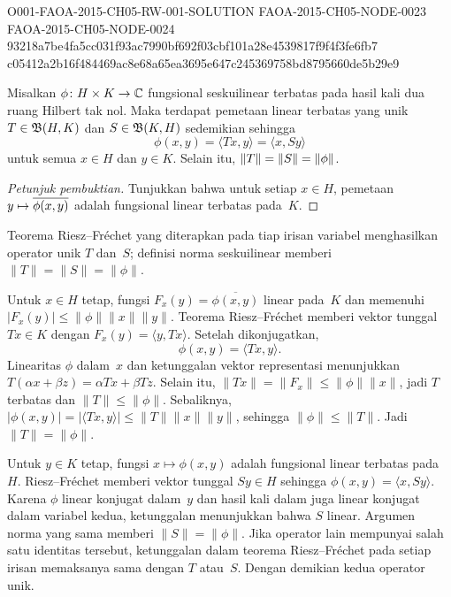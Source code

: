 \begin{o001readerwork}
  {O001-FAOA-2015-CH05-RW-001-SOLUTION}
  {FAOA-2015-CH05-NODE-0023}
  {FAOA-2015-CH05-NODE-0024}
  {93218a7be4fa5cc031f93ac7990bf692f03cbf101a28e4539817f9f4f3fe6fb7}
  {c05412a2b16f484469ac8e68a65ea3695e647c245369758bd8795660de5b29e9}
\begin{o001result}
\begin{prop} Misalkan $\phi \colon H \times K \rightarrow \mathbb{C}$ fungsional seskuilinear terbatas pada
hasil kali dua ruang Hilbert tak nol. Maka terdapat pemetaan linear terbatas yang unik $T \in \mathfrak{B}(H,K)$ dan
$S \in \mathfrak{B}(K,H)$ sedemikian sehingga
    \[ \phi(x,y) = \langle Tx,y \rangle = \langle x,Sy \rangle \]
untuk semua $x \in H$ dan $y \in K$. Selain itu, $\lVert T\rVert = \lVert S\rVert = \lVert\phi\rVert$.
\end{prop}
\end{o001result}
\begin{o001sourcehint}
\begin{proof}[\emph{Petunjuk pembuktian}] Tunjukkan bahwa untuk setiap $x \in H$, pemetaan
$y \mapsto \overline{\phi(x,y)}$ adalah fungsional linear terbatas pada~$K$. \ns
\end{proof}
\end{o001sourcehint}
\begin{o001answer}
Teorema Riesz--Fréchet yang diterapkan pada tiap irisan variabel menghasilkan
operator unik $T$ dan~$S$; definisi norma seskuilinear memberi
$\|T\|=\|S\|=\|\phi\|$.
\end{o001answer}
\begin{o001proof}
Untuk $x\in H$ tetap, fungsi
$F_x(y)=\overline{\phi(x,y)}$ linear pada~$K$ dan memenuhi
$|F_x(y)|\leq\|\phi\|\|x\|\|y\|$. Teorema Riesz--Fréchet memberi vektor
tunggal $Tx\in K$ dengan $F_x(y)=\langle y,Tx\rangle$. Setelah dikonjugatkan,
\[
 \phi(x,y)=\langle Tx,y\rangle.
\]
Linearitas $\phi$ dalam~$x$ dan ketunggalan vektor representasi menunjukkan
$T(\alpha x+\beta z)=\alpha Tx+\beta Tz$. Selain itu,
$\|Tx\|=\|F_x\|\leq\|\phi\|\|x\|$, jadi $T$ terbatas dan
$\|T\|\leq\|\phi\|$. Sebaliknya,
$|\phi(x,y)|=|\langle Tx,y\rangle|\leq\|T\|\|x\|\|y\|$, sehingga
$\|\phi\|\leq\|T\|$. Jadi $\|T\|=\|\phi\|$.

Untuk $y\in K$ tetap, fungsi $x\mapsto\phi(x,y)$ adalah fungsional linear
terbatas pada~$H$. Riesz--Fréchet memberi vektor tunggal $Sy\in H$ sehingga
$\phi(x,y)=\langle x,Sy\rangle$. Karena $\phi$ linear konjugat dalam~$y$ dan
hasil kali dalam juga linear konjugat dalam variabel kedua, ketunggalan
menunjukkan bahwa $S$ linear. Argumen norma yang sama memberi
$\|S\|=\|\phi\|$. Jika operator lain mempunyai salah satu identitas tersebut,
ketunggalan dalam teorema Riesz--Fréchet pada setiap irisan memaksanya sama
dengan $T$ atau~$S$. Dengan demikian kedua operator unik.
\end{o001proof}
\end{o001readerwork}


